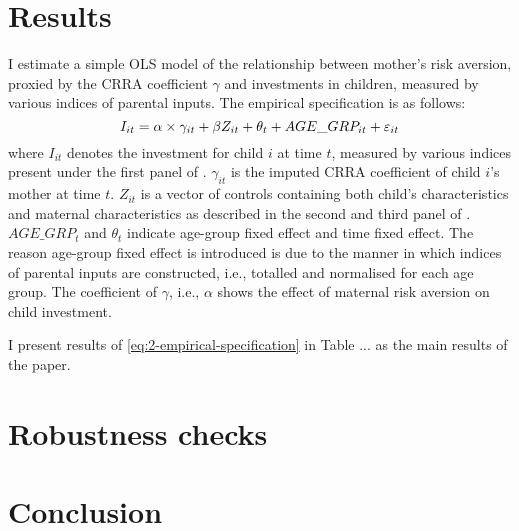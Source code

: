 \documentclass[]{article}
\begin{document}
\section{Results}
I estimate a simple OLS model of the relationship between mother's risk aversion, proxied by the CRRA coefficient $\gamma$ and investments in children, measured by various indices of parental inputs. The empirical specification is as follows:
\begin{equation}
	I_{it} = \alpha \times \gamma_{it} + \beta{\boldmath Z_{it}} + \theta_t + AGE\_GRP_{it} + \varepsilon_{it}
	\label{eq:2-empirical-specification}
\end{equation}
where $I_{it}$ denotes the investment for child $i$ at time $t$, measured by various indices present under the first panel of . $\gamma_{it}$ is the imputed CRRA coefficient of child $i$'s mother at time $t$. $Z_{it}$ is a vector of controls containing both child's characteristics and maternal characteristics as described in the second and third panel of . $AGE\_GRP_t$ and $\theta_t$ indicate age-group fixed effect and time fixed effect. The reason age-group fixed effect is introduced is due to the manner in which indices of parental inputs are constructed, i.e., totalled and normalised for each age group. The coefficient of $\gamma$, i.e., $\alpha$ shows the effect of maternal risk aversion on child investment.

I present results of \eqref{eq:2-empirical-specification} in Table ... as the main results of the paper. 



\section{Robustness checks}





\section{Conclusion}

\pagebreak



\end{document}
